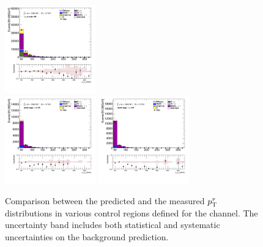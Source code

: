 \begin{figure}[!htp]
\begin{center}
			\includegraphics[width=0.35\textwidth]{chapters/chapter6_HPlus/images/taulep/tau_0_pt_TAUMU_BVETO.png} \\
			\includegraphics[width=0.35\textwidth]{chapters/chapter6_HPlus/images/taulep/tau_0_pt_SS_TAUEL.png} 
			\includegraphics[width=0.35\textwidth]{chapters/chapter6_HPlus/images/taulep/tau_0_pt_SS_TAUMU.png} \\
			\end{center}
			\caption{
			Comparison between the predicted and the measured $p_{\text{T}}^{\tau}$ distributions in various control regions defined for the \taulep channel. The uncertainty band includes both statistical and systematic uncertainties on the background prediction. 
			}
			\label{fig:bkg-pt-tau-taulep}
		\end{figure}
		
